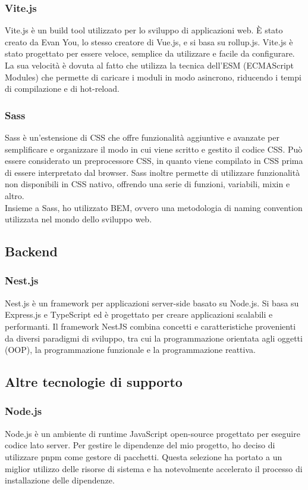 \subsubsection{Vite.js}\label{subsubsec:vite}
Vite.js è un build tool utilizzato per lo sviluppo di applicazioni web. È stato creato da Evan You, lo stesso creatore di Vue.js, e si basa su rollup.js.
Vite.js è stato progettato per essere veloce, semplice da utilizzare e facile da configurare. La sua velocità è dovuta al fatto che utilizza la tecnica dell'ESM (ECMAScript Modules) 
che permette di caricare i moduli in modo asincrono, riducendo i tempi di compilazione e di hot-reload.
\subsubsection{Sass}\label{subsubsec:Sass}
Sass è un'estensione di CSS che offre funzionalità aggiuntive e avanzate per semplificare e organizzare il modo in cui viene scritto e gestito il codice CSS.
Può essere considerato un preprocessore CSS, in quanto viene compilato in CSS prima di essere interpretato dal browser. Sass inoltre permette di utilizzare funzionalità non disponibili in CSS nativo, offrendo una serie di funzioni, variabili, mixin e altro.\\
Insieme a Sass, ho utilizzato BEM, ovvero una metodologia di naming convention utilizzata nel mondo dello sviluppo web.

\subsection{Backend}\label{subsec:backend}
\subsubsection{Nest.js}\label{subsubsec:nest}
Nest.js è un framework per applicazioni server-side basato su Node.js. Si basa su Express.js e TypeScript ed è progettato per creare applicazioni scalabili e performanti.
Il framework NestJS combina concetti e caratteristiche provenienti da diversi paradigmi di sviluppo, tra cui la programmazione orientata agli oggetti (OOP), la programmazione funzionale e la programmazione reattiva.

\subsection{Altre tecnologie di supporto}\label{subsec:altre-tecnologie-di-supporto}
\subsubsection{Node.js}\label{subsubsec:node.js}
Node.js è un ambiente di runtime JavaScript open-source progettato per eseguire codice lato server. Per gestire le dipendenze del mio progetto,
ho deciso di utilizzare pnpm come gestore di pacchetti. Questa selezione ha portato a un miglior utilizzo delle risorse di sistema e ha notevolmente accelerato il processo di 
installazione delle dipendenze.
